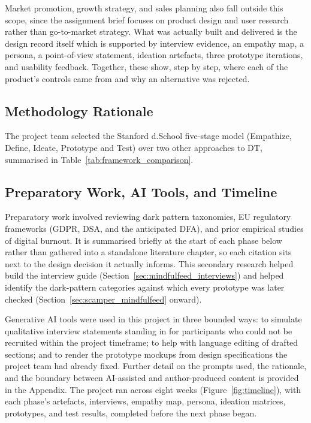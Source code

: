 \documentclass[11pt]{article}
\begin{document}
Market promotion, growth strategy, and sales planning also fall outside this scope, since the assignment brief focuses on product design and user research rather than go-to-market strategy. What was actually built and delivered is the design record itself which is supported by interview evidence, an empathy map, a persona, a point-of-view statement, ideation artefacts, three prototype iterations, and usability feedback. Together, these show, step by step, where each of the product's controls came from and why an alternative was rejected.

\subsection{Methodology Rationale}
The project team selected the Stanford d.School five-stage model (Empathize, Define, Ideate, Prototype and Test) over two other approaches to DT, summarised in Table~\ref{tab:framework_comparison}.

\subsection{Preparatory Work, AI Tools, and Timeline}
Preparatory work involved reviewing dark pattern taxonomies, EU regulatory frameworks (GDPR, DSA, and the anticipated DFA), and prior empirical studies of digital burnout. It is summarised briefly at the start of each phase below rather than gathered into a standalone literature chapter, so each citation sits next to the design decision it actually informs. This secondary research helped build the interview guide (Section~\ref{sec:mindfulfeed_interviews}) and helped identify the dark-pattern categories against which every prototype was later checked (Section~\ref{sec:scamper_mindfulfeed} onward).

Generative AI tools were used in this project in three bounded ways: to simulate qualitative interview statements standing in for participants who could not be recruited within the project timeframe; to help with language editing of drafted sections; and to render the prototype mockups from design specifications the project team had already fixed. Further detail on the prompts used, the rationale, and the boundary between AI-assisted and author-produced content is provided in the Appendix. The project ran across eight weeks (Figure~\ref{fig:timeline}), with each phase's artefacts, interviews, empathy map, persona, ideation matrices, prototypes, and test results, completed before the next phase began.
\end{document}
